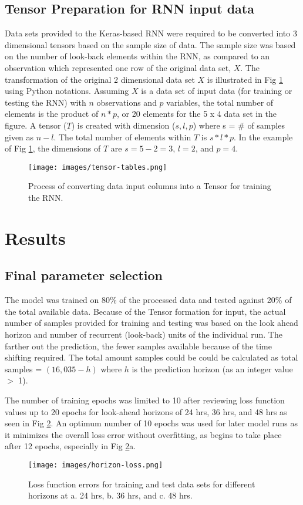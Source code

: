 \documentclass[preprint,12pt,authoryear]{elsarticle}
\begin{document}
\begin{linenumbers}
\subsection{Tensor Preparation for RNN input data}
Data sets provided to the Keras-based RNN were required to be converted into 3 dimensional tensors based on the sample size of data. The sample size was based on the number of look-back elements within the RNN, as compared to an observation which represented one row of the original data set, $X$.  The transformation of the original 2 dimensional data set $X$ is illustrated in Fig \ref{fig:tensor-tables} using Python notations. Assuming $X$ is a data set of input data (for training or testing the RNN) with $n$ observations and $p$ variables, the total number of elements is the product of $n * p$, or 20 elements for the 5 x 4 data set in the figure. A tensor ($T$) is created with dimension ($s, l, p$) where s = \# of samples given as $n - l$. The total number of elements within $T$ is $s*l*p$. In the example of Fig \ref{fig:tensor-tables}, the dimensions of $T$ are $s = 5 - 2 = 3$, $l = 2$, and $p = 4$.    
%
\begin{figure}[H]
\centering
\texttt{[image: images/tensor-tables.png]}  %
\caption{Process of converting data input columns into a Tensor for training the RNN.}
\label{fig:tensor-tables}
\end{figure}
%

\section{Results}
\subsection{Final parameter selection}
The model was trained on 80\% of the processed data and tested against 20\% of the total available data. Because of the Tensor formation for input, the actual number of samples provided for training and testing was based on the look ahead horizon and number of recurrent (look-back) units of the individual run. The farther out the prediction, the fewer samples available because of the time shifting required. The total amount samples could be could be calculated as total samples = $(16,035 - h)$ where $h$ is the prediction horizon (as an integer value $>$ 1). 

The number of training epochs was limited to 10 after reviewing loss function values up to 20 epochs for look-ahead horizons of 24 hrs, 36 hrs, and 48 hrs as seen in Fig \ref{fig:horizon-loss}. An optimum number of 10 epochs was used for later model runs as it minimizes the overall loss error without overfitting, as begins to take place after 12 epochs, especially in Fig \ref{fig:horizon-loss}a. 
%
\begin{figure}[H]
\centering
\texttt{[image: images/horizon-loss.png]}  %
\caption{Loss function errors for training and test data sets for different horizons at a. 24 hrs, b. 36 hrs, and c. 48 hrs.}
\label{fig:horizon-loss}
\end{figure}
%


\end{linenumbers}
\end{document}
